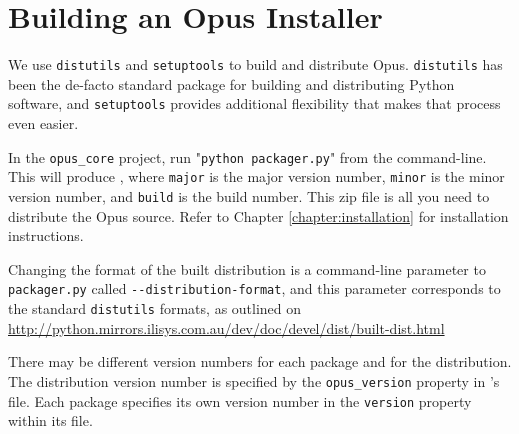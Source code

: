 \section{Building an Opus Installer}

We use \verb|distutils| and \verb|setuptools| to build and distribute Opus.
\verb|distutils| has been the de-facto standard package for building and
distributing Python software, and \verb|setuptools| provides additional
flexibility that makes that process even easier.

In the \verb|opus_core| project, run "\verb|python packager.py|" from the
command-line. This will produce , where \verb|major| is the 
major version number, \verb|minor| is the minor version number, and 
\verb|build| is the build number.
This zip file is all you need to distribute the Opus source. Refer to Chapter
\ref{chapter:installation} for installation instructions.

Changing the format of the built distribution is a command-line parameter
to \verb|packager.py| called \verb|--distribution-format|,
and this parameter corresponds to the standard \verb|distutils| formats,
as outlined on \url{http://python.mirrors.ilisys.com.au/dev/doc/devel/dist/built-dist.html}

There may be different version numbers for each package and for the
distribution.  The distribution version number is specified by the
\verb|opus_version| property in 's
 file.  Each
package specifies its own version number in the \verb|version| property within
its  file.



